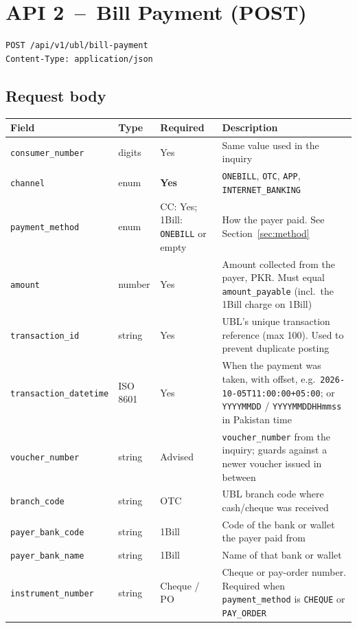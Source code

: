 \documentclass[11pt]{article}
\begin{document}
\section{API 2 \,--\, Bill Payment (POST)}\label{sec:payment}

\begin{lstlisting}
POST /api/v1/ubl/bill-payment
Content-Type: application/json
\end{lstlisting}

\subsection{Request body}
\begin{longtable}{@{}p{} p{} >{\raggedright\arraybackslash}p{} >{\raggedright\arraybackslash}p{}@{}}
\toprule
\textbf{Field} & \textbf{Type} & \textbf{Required} & \textbf{Description} \\
\midrule
\endhead
\texttt{consumer\_number} & digits & Yes & Same value used in the inquiry \\
\texttt{channel} & enum & \textbf{Yes} & \texttt{ONEBILL}, \texttt{OTC}, \texttt{APP}, \texttt{INTERNET\_BANKING} \\
\texttt{payment\_method} & enum & CC: Yes; 1Bill: \texttt{ONEBILL} or empty & How the payer paid. See Section~\ref{sec:method} \\
\texttt{amount} & number & Yes & Amount collected from the payer, PKR. Must equal \texttt{amount\_payable} (incl.\ the 1Bill charge on 1Bill) \\
\texttt{transaction\_id} & string & Yes & UBL's unique transaction reference (max 100). Used to prevent duplicate posting \\
\texttt{transaction\_datetime} & ISO 8601 & Yes & When the payment was taken, with offset, e.g.\ \texttt{2026-10-05T11:00:00+05:00}; or \texttt{YYYYMMDD} / \texttt{YYYYMMDDHHmmss} in Pakistan time \\
\texttt{voucher\_number} & string & Advised & \texttt{voucher\_number} from the inquiry; guards against a newer voucher issued in between \\
\texttt{branch\_code} & string & OTC & UBL branch code where cash/cheque was received \\
\texttt{payer\_bank\_code} & string & 1Bill & Code of the bank or wallet the payer paid from \\
\texttt{payer\_bank\_name} & string & 1Bill & Name of that bank or wallet \\
\texttt{instrument\_number} & string & Cheque / PO & Cheque or pay-order number. Required when \texttt{payment\_method} is \texttt{CHEQUE} or \texttt{PAY\_ORDER} \\
\bottomrule
\end{longtable}
\end{document}
